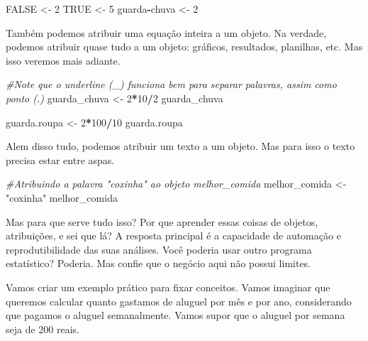 \documentclass[
]{book}
\newenvironment{Shaded}{\begin{snugshade}}{\end{snugshade}}
\newcommand{\CommentTok}[1]{\textcolor[rgb]{0.56,0.35,0.01}{\textit{#1}}}
\newcommand{\ConstantTok}[1]{\textcolor[rgb]{0.56,0.35,0.01}{#1}}
\newcommand{\DecValTok}[1]{\textcolor[rgb]{0.00,0.00,0.81}{#1}}
\newcommand{\NormalTok}[1]{#1}
\newcommand{\OtherTok}[1]{\textcolor[rgb]{0.56,0.35,0.01}{#1}}
\newcommand{\SpecialCharTok}[1]{\textcolor[rgb]{0.81,0.36,0.00}{\textbf{#1}}}
\newcommand{\StringTok}[1]{\textcolor[rgb]{0.31,0.60,0.02}{#1}}
\begin{document}
\begin{Shaded}
\begin{Highlighting}[]
\ConstantTok{FALSE} \OtherTok{\textless{}{-}} \DecValTok{2}
\ConstantTok{TRUE} \OtherTok{\textless{}{-}} \DecValTok{5}
\NormalTok{guarda}\SpecialCharTok{{-}}\NormalTok{chuva }\OtherTok{\textless{}{-}} \DecValTok{2}
\end{Highlighting}
\end{Shaded}

Também podemos atribuir uma equação inteira a um objeto. Na verdade, podemos atribuir quase tudo a um objeto: gráficos, resultados, planilhas, etc. Mas isso veremos mais adiante.

\begin{Shaded}
\begin{Highlighting}[]
\CommentTok{\#Note que o underline (\_) funciona bem para separar palavras, assim como ponto (.)}
\NormalTok{guarda\_chuva }\OtherTok{\textless{}{-}} \DecValTok{2}\SpecialCharTok{*}\DecValTok{10}\SpecialCharTok{/}\DecValTok{2}
\NormalTok{guarda\_chuva}

\NormalTok{guarda.roupa }\OtherTok{\textless{}{-}} \DecValTok{2}\SpecialCharTok{*}\DecValTok{100}\SpecialCharTok{/}\DecValTok{10}
\NormalTok{guarda.roupa}
\end{Highlighting}
\end{Shaded}

Alem disso tudo, podemos atribuir um texto a um objeto. Mas para isso o texto precisa estar entre aspas.

\begin{Shaded}
\begin{Highlighting}[]
\CommentTok{\#Atribuindo a palavra "coxinha" ao objeto melhor\_comida}
\NormalTok{melhor\_comida }\OtherTok{\textless{}{-}} \StringTok{"coxinha"}
\NormalTok{melhor\_comida}
\end{Highlighting}
\end{Shaded}

Mas para que serve tudo isso? Por que aprender essas coisas de objetos, atribuições, e sei que lá? A resposta principal é a capacidade de automação e reprodutibilidade das suas análises. Você poderia usar outro programa estatístico? Poderia. Mas confie que o negócio aqui não possui limites.

Vamos criar um exemplo prático para fixar conceitos. Vamos imaginar que queremos calcular quanto gastamos de aluguel por mês e por ano, considerando que pagamos o aluguel semanalmente. Vamos supor que o aluguel por semana seja de 200 reais.
\end{document}
